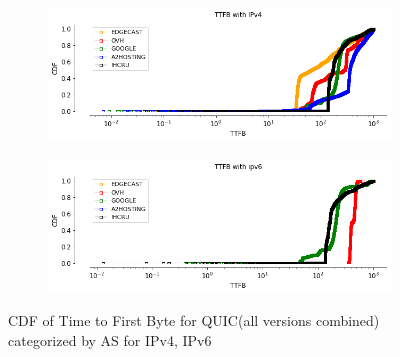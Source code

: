 \begin{frame}
\begin{figure}[!htb]
    \begin{subfigure}{0.45\textwidth}
        \includegraphics[width=\linewidth]
        {./plots/VM//TTFB_ipv4_asno.png}
    \end{subfigure}
    \begin{subfigure}{0.45\textwidth}
        \includegraphics[width=\linewidth]
        {./plots/VM/TTFB_ipv6_asno.png}
    \end{subfigure}
    \caption{\label{fig:TTFB_ipv6_asno}CDF of Time to First Byte for QUIC(all versions combined) categorized by AS for IPv4, IPv6}
\end{figure}

\end{frame}
\clearpage

